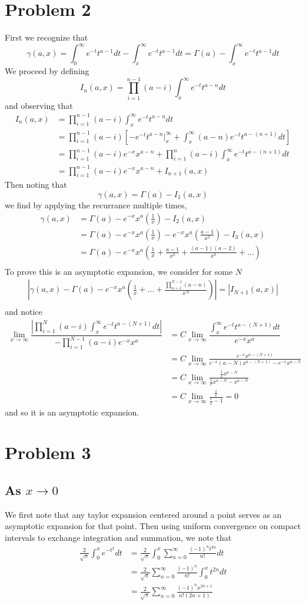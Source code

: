 \documentclass[12pt]{article}
\newcommand{\eq}[1]{\begin{align*}#1\end{align*}}
\begin{document}
\section*{Problem 2}
First we recognize that
$$\gamma(a,x) = \int_0^\infty e^{-t}t^{a-1}dt - \int_x^\infty e^{-t}t^{a-1}dt = \Gamma(a) - \int_x^\infty e^{-t}t^{a-1}dt$$
We proceed by defining
\begin{equation}
	I_n(a,x) = \prod_{i=1}^{n-1}(a - i)\int_x^\infty e^{-t}t^{a - n}dt
\end{equation}
and observing that
\eq{
	I_n(a,x) &= \prod_{i=1}^{n-1}(a - i)\int_x^\infty e^{-t}t^{a - n}dt\\
	&= \prod_{i=1}^{n-1}(a - i)\left[-e^{-t}t^{a - n}|_x^\infty + \int_x^\infty(a - n)e^{-t}t^{a - (n+1)}dt\right]\\
	&= \prod_{i=1}^{n-1}(a - i)e^{-x}x^{a - n} + \prod_{i=1}^{n}(a - i)\int_x^\infty e^{-t}t^{a - (n+1)}dt\\
	&= \prod_{i=1}^{n-1}(a - i)e^{-x}x^{a - n} + I_{n+1}(a,x)
}
Then noting that
$$\gamma(a,x) = \Gamma(a) - I_1(a,x)$$
we find by applying the recurrance multiple times,
\eq{
	\gamma(a,x) &= \Gamma(a) - e^{-x}x^a(\frac{1}{x}) - I_2(a,x)\\
	&= \Gamma(a) - e^{-x}x^a(\frac{1}{x}) - e^{-x}x^a(\frac{a-1}{x^2}) - I_3(a,x)\\
	&= \Gamma(a) - e^{-x}x^a(\frac{1}{x} + \frac{a-1}{x^2} + \frac{(a-1)(a-2)}{x^3} + ...)\\
}
To prove this is an asymptotic expansion, we consider for some $N$
\eq{
	|\gamma(a,x) - \Gamma(a) - e^{-x}x^a(\frac{1}{x} + ... + \frac{\prod_{n=1}^{N-1} (a-n)}{x^N})| = |I_{N+1}(a,x)|\\
}
and notice
\eq{
	\lim_{x\rightarrow\infty} \dfrac{|\prod_{i=1}^N(a-i)\int_x^\infty e^{-t}t^{a-(N+1)} dt|}{-\prod_{i=1}^{N-1}(a-i)e^{-x}x^a} &= C\lim_{x\rightarrow\infty}\dfrac{\int_x^\infty e^{-t}t^{a-(N+1)}dt}{e^{-x}x^a}\\
	&= C\lim_{x\rightarrow\infty} \frac{e^{-x}x^{a-(N+1)}}{e^{-x}(a-N)x^{a-(N+1)} - e^{-x}x^{a-N}}\\
	&= C\lim_{x\rightarrow\infty} \frac{\frac{1}{x}x^{a-N}}{\frac{1}{x}x^{a-N} - x^{a-N}}\\
	&= C\lim_{x\rightarrow\infty} \frac{\frac{1}{x}}{\frac{1}{x} - 1} = 0
}
and so it is an asymptotic expansion.
\section*{Problem 3}
\subsection*{As $x\rightarrow0$} We first note that any taylor expansion centered around a point serves as an asymptotic expansion for that point. Then using uniform convergence on compact intervals to exchange integration and summation, we note that
\eq{
	\frac{2}{\sqrt{\pi}}\int_0^x e^{-t^2} dt &= \frac{2}{\sqrt{\pi}}\int_0^x\sum_{n=0}^\infty \frac{(-1)^nt^{2n}}{n!} dt\\
	&= \frac{2}{\sqrt{\pi}} \sum_{n=0}^\infty \frac{(-1)^n}{n!}\int_0^x t^{2n}dt\\
	&= \frac{2}{\sqrt{\pi}} \sum_{n=0}^\infty \frac{(-1)^n x^{2n+1}}{n!(2n+1)}
}
\end{document}

